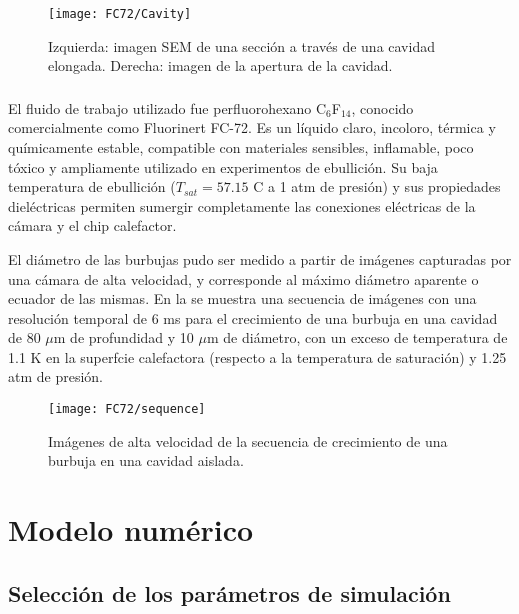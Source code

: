 \begin{figure}[ht]
	\centering
	\texttt{[image: FC72/Cavity]}
	\caption{Izquierda: imagen SEM de una secci\'on a trav\'es de una cavidad elongada. Derecha: imagen de la apertura de la cavidad.}
	\label{fig:cavidad}
\end{figure}


\subsubsection{}

El fluido de trabajo utilizado fue perfluorohexano C$_6$F$_14$, conocido comercialmente como Fluorinert FC-72. Es un l\'iquido claro, incoloro, t\'ermica y qu\'imicamente estable, compatible con materiales sensibles, inflamable, poco t\'oxico y ampliamente utilizado en experimentos de ebullici\'on. Su baja temperatura de ebullici\'on ($T_{sat}=57.15$ \textordmasculine C a 1 atm de presi\'on) y sus propiedades diel\'ectricas permiten sumergir completamente las conexiones el\'ectricas de la c\'amara y el chip calefactor.  


El di\'ametro de las burbujas pudo ser medido a partir de im\'agenes capturadas por una c\'amara de alta velocidad, y corresponde al m\'aximo di\'ametro aparente o ecuador de las mismas. En la  se muestra una secuencia de im\'agenes con una resoluci\'on temporal de 6 ms para el crecimiento de una burbuja en una cavidad de 80 $\mu$m de profundidad y 10 $\mu$m de di\'ametro, con un exceso de temperatura de 1.1 K en la superfcie calefactora (respecto a la temperatura de saturaci\'on) y 1.25 atm de presi\'on.

\begin{figure}[ht]
	\centering
	\texttt{[image: FC72/sequence]}
	\caption{Im\'agenes de alta velocidad de la secuencia de crecimiento de una burbuja en una cavidad aislada.}
	\label{fig:sequence}
\end{figure}





\section{Modelo num\'erico}

\subsection{Selecci\'on de los par\'ametros de simulaci\'on}
\label{sec:param_sim_fc72}


